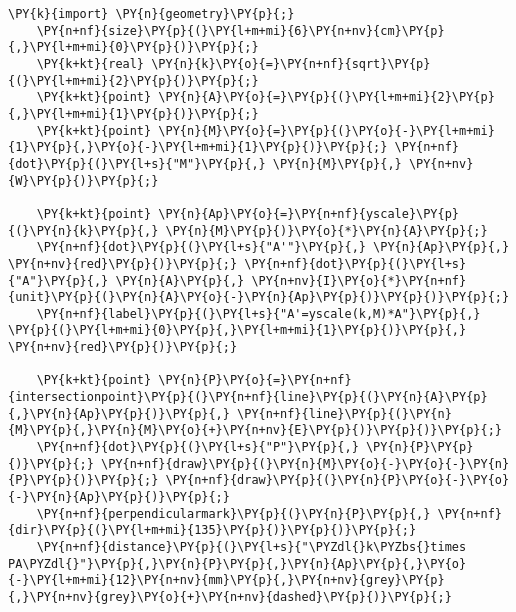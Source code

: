 \begin{Verbatim}[commandchars=\\\{\}]
    \PY{k}{import} \PY{n}{geometry}\PY{p}{;}
    \PY{n+nf}{size}\PY{p}{(}\PY{l+m+mi}{6}\PY{n+nv}{cm}\PY{p}{,}\PY{l+m+mi}{0}\PY{p}{)}\PY{p}{;}
    \PY{k+kt}{real} \PY{n}{k}\PY{o}{=}\PY{n+nf}{sqrt}\PY{p}{(}\PY{l+m+mi}{2}\PY{p}{)}\PY{p}{;}
    \PY{k+kt}{point} \PY{n}{A}\PY{o}{=}\PY{p}{(}\PY{l+m+mi}{2}\PY{p}{,}\PY{l+m+mi}{1}\PY{p}{)}\PY{p}{;}
    \PY{k+kt}{point} \PY{n}{M}\PY{o}{=}\PY{p}{(}\PY{o}{-}\PY{l+m+mi}{1}\PY{p}{,}\PY{o}{-}\PY{l+m+mi}{1}\PY{p}{)}\PY{p}{;} \PY{n+nf}{dot}\PY{p}{(}\PY{l+s}{"M"}\PY{p}{,} \PY{n}{M}\PY{p}{,} \PY{n+nv}{W}\PY{p}{)}\PY{p}{;}

    \PY{k+kt}{point} \PY{n}{Ap}\PY{o}{=}\PY{n+nf}{yscale}\PY{p}{(}\PY{n}{k}\PY{p}{,} \PY{n}{M}\PY{p}{)}\PY{o}{*}\PY{n}{A}\PY{p}{;}
    \PY{n+nf}{dot}\PY{p}{(}\PY{l+s}{"A'"}\PY{p}{,} \PY{n}{Ap}\PY{p}{,} \PY{n+nv}{red}\PY{p}{)}\PY{p}{;} \PY{n+nf}{dot}\PY{p}{(}\PY{l+s}{"A"}\PY{p}{,} \PY{n}{A}\PY{p}{,} \PY{n+nv}{I}\PY{o}{*}\PY{n+nf}{unit}\PY{p}{(}\PY{n}{A}\PY{o}{-}\PY{n}{Ap}\PY{p}{)}\PY{p}{)}\PY{p}{;}
    \PY{n+nf}{label}\PY{p}{(}\PY{l+s}{"A'=yscale(k,M)*A"}\PY{p}{,} \PY{p}{(}\PY{l+m+mi}{0}\PY{p}{,}\PY{l+m+mi}{1}\PY{p}{)}\PY{p}{,} \PY{n+nv}{red}\PY{p}{)}\PY{p}{;}

    \PY{k+kt}{point} \PY{n}{P}\PY{o}{=}\PY{n+nf}{intersectionpoint}\PY{p}{(}\PY{n+nf}{line}\PY{p}{(}\PY{n}{A}\PY{p}{,}\PY{n}{Ap}\PY{p}{)}\PY{p}{,} \PY{n+nf}{line}\PY{p}{(}\PY{n}{M}\PY{p}{,}\PY{n}{M}\PY{o}{+}\PY{n+nv}{E}\PY{p}{)}\PY{p}{)}\PY{p}{;}
    \PY{n+nf}{dot}\PY{p}{(}\PY{l+s}{"P"}\PY{p}{,} \PY{n}{P}\PY{p}{)}\PY{p}{;} \PY{n+nf}{draw}\PY{p}{(}\PY{n}{M}\PY{o}{-}\PY{o}{-}\PY{n}{P}\PY{p}{)}\PY{p}{;} \PY{n+nf}{draw}\PY{p}{(}\PY{n}{P}\PY{o}{-}\PY{o}{-}\PY{n}{Ap}\PY{p}{)}\PY{p}{;}
    \PY{n+nf}{perpendicularmark}\PY{p}{(}\PY{n}{P}\PY{p}{,} \PY{n+nf}{dir}\PY{p}{(}\PY{l+m+mi}{135}\PY{p}{)}\PY{p}{)}\PY{p}{;}
    \PY{n+nf}{distance}\PY{p}{(}\PY{l+s}{"\PYZdl{}k\PYZbs{}times PA\PYZdl{}"}\PY{p}{,}\PY{n}{P}\PY{p}{,}\PY{n}{Ap}\PY{p}{,}\PY{o}{-}\PY{l+m+mi}{12}\PY{n+nv}{mm}\PY{p}{,}\PY{n+nv}{grey}\PY{p}{,}\PY{n+nv}{grey}\PY{o}{+}\PY{n+nv}{dashed}\PY{p}{)}\PY{p}{;}
\end{Verbatim}
